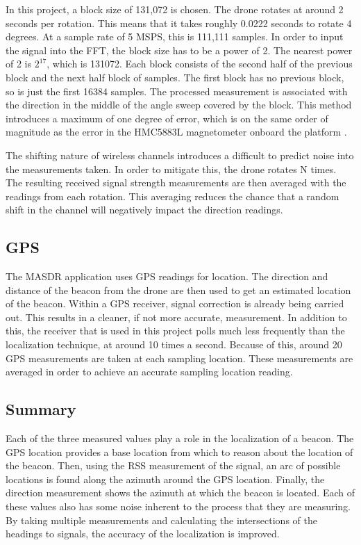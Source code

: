 In this project, a block size of 131,072 is chosen. The drone rotates at around 2 seconds per rotation. This means that it takes roughly 0.0222 seconds to rotate 4 degrees. At a sample rate of 5 MSPS, this is 111,111 samples. In order to input the signal into the FFT, the block size has to be a power of 2. The nearest power of 2 is $2^{17}$, which is 131072. Each block consists of the second half of the previous block and the next half block of samples. The first block has no previous block, so is just the first 16384 samples. The processed measurement is associated with the direction in the middle of the angle sweep covered by the block. This method introduces a maximum of one degree of error, which is on the same order of magnitude as the error in the HMC5883L magnetometer onboard the platform \cite{magnetometer_data}. \par 
The shifting nature of wireless channels introduces a difficult to predict noise into the measurements taken. In order to mitigate this, the drone rotates N times. The resulting received signal strength measurements are then averaged with the readings from each rotation. This averaging reduces the chance that a random shift in the channel will negatively impact the direction readings. \par 
\subsection{GPS}
The MASDR application uses GPS readings for location. The direction and distance of the beacon from the drone are then used to get an estimated location of the beacon. 
Within a GPS receiver, signal correction is already being carried out. This results in a cleaner, if not more accurate, measurement. In addition to this, the receiver that is used in this project polls much less frequently than the localization technique, at around 10 times a second. Because of this, around 20 GPS measurements are taken at each sampling location. These measurements are averaged in order to achieve an accurate sampling location reading.\par 
\subsection{Summary}
Each of the three measured values play a role in the localization of a beacon. The GPS location provides a base location from which to reason about the location of the beacon. Then, using the RSS measurement of the signal, an arc of possible locations is found along the azimuth around the GPS location. Finally, the direction measurement shows the azimuth at which the beacon is located. Each of these values also has some noise inherent to the process that they are measuring. By taking multiple measurements and calculating the intersections of the headings to signals, the accuracy of the localization is improved.

